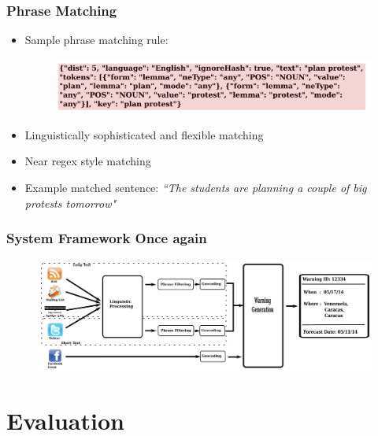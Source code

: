 \documentclass[red,handout]{beamer}
\begin{document}
\begin{frame}
    \frametitle{Phrase Matching}
    \begin{itemize}[<+->]
        \item
            Sample phrase matching rule:
            \begin{figure}
                \includegraphics[scale=0.5]{phrase_rule}
            \end{figure}
        \item
            Linguistically sophisticated and flexible matching
        \item
            Near regex style matching
        \item
            Example matched sentence:
            {\em ``The students are planning a couple of big protests tomorrow"}
    \end{itemize}
\end{frame}


\begin{frame}
    \frametitle{System Framework Once again}
    \begin{figure}
        \centering
        \includegraphics[height=0.6\textheight,width=\textwidth]{pipeline}
    \end{figure}
\end{frame}

\section{Evaluation}
\end{document}
